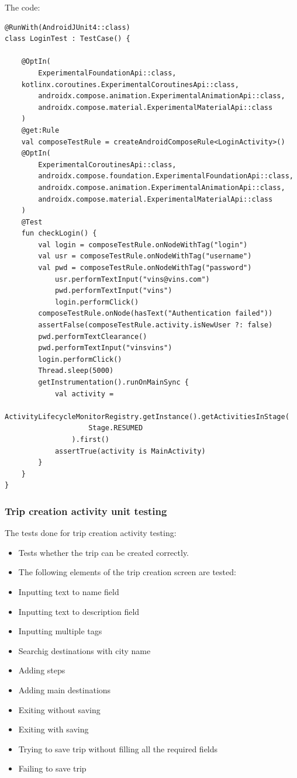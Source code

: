 The code:
\begin{verbatim}
@RunWith(AndroidJUnit4::class)
class LoginTest : TestCase() {

    @OptIn(
        ExperimentalFoundationApi::class,
    kotlinx.coroutines.ExperimentalCoroutinesApi::class,
        androidx.compose.animation.ExperimentalAnimationApi::class,
        androidx.compose.material.ExperimentalMaterialApi::class
    )
    @get:Rule
    val composeTestRule = createAndroidComposeRule<LoginActivity>()
    @OptIn(
        ExperimentalCoroutinesApi::class,
        androidx.compose.foundation.ExperimentalFoundationApi::class,
        androidx.compose.animation.ExperimentalAnimationApi::class,
        androidx.compose.material.ExperimentalMaterialApi::class
    )
    @Test
    fun checkLogin() {
        val login = composeTestRule.onNodeWithTag("login")
        val usr = composeTestRule.onNodeWithTag("username")
        val pwd = composeTestRule.onNodeWithTag("password")
            usr.performTextInput("vins@vins.com")
            pwd.performTextInput("vins")
            login.performClick()
        composeTestRule.onNode(hasText("Authentication failed"))
        assertFalse(composeTestRule.activity.isNewUser ?: false)
        pwd.performTextClearance()
        pwd.performTextInput("vinsvins")
        login.performClick()
        Thread.sleep(5000)
        getInstrumentation().runOnMainSync {
            val activity =
                ActivityLifecycleMonitorRegistry.getInstance().getActivitiesInStage(
                    Stage.RESUMED
                ).first()
            assertTrue(activity is MainActivity)
        }
    }
}

\end{verbatim}

\subsubsection{Trip creation activity unit testing}
The tests done for trip creation activity testing:
\begin{itemize}
\item Tests whether the trip can be created correctly.
\item The following elements of the trip creation screen are tested:
\item Inputting text to name field
\item Inputting text to description field
\item Inputting multiple tags
\item Searchig destinations with city name
\item Adding steps
\item Adding main destinations
\item Exiting without saving
\item Exiting with saving
\item Trying to save trip without filling all the required fields
\item Failing to save trip
\end{itemize}

